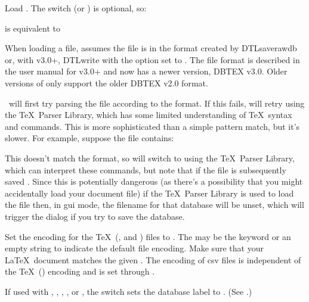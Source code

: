 Load . The switch 
(or ) is optional, so:
\begin{terminal}
 
\end{terminal}
is equivalent to 
\begin{terminal}
  
\end{terminal}

When loading a  file,  assumes the
 file is in the format created by \gls{DTLsaverawdb} or,
with  v3.0+, \gls{DTLwrite} with the  option
set to . The file format is described in the user
manual for  v3.0+ and now has a newer version, 
DBTEX v3.0. Older versions of  only support the
older DBTEX v2.0 format.

\appname\ will first try parsing the file according to the  format. 
If this fails, 
will retry using the \TeX\ Parser Library, which has some limited
understanding of \TeX\ syntax and  commands.
This is more sophisticated than a simple pattern match, but it's slower.
For example, suppose the file contains:

This doesn't match the  format, so  will
switch to using the \TeX\ Parser Library, which can interpret these
commands, but note that if the file is subsequently saved
. Since this is
potentially dangerous (as there's a possibility that you might
accidentally load your document  file) if the 
\TeX\ Parser Library is used to load the file then, in \gls{gui}
mode, the filename for that database will be unset, which will 
trigger the  dialog if you try to save the database.

Set the encoding for the \TeX\ (,  and ) files to 
. The  may
be the keyword  or an empty string to
indicate the default file encoding. Make sure that your \LaTeX\
document matches the given . The encoding of 
\gls{csv} files is independent of the \TeX\ () 
encoding and is set through .

If used with , , , , 
or \switch{probsoln}, the \switch{name} switch sets the database label to 
\meta{name}. (See \sectionref{sec:fileext}.)

